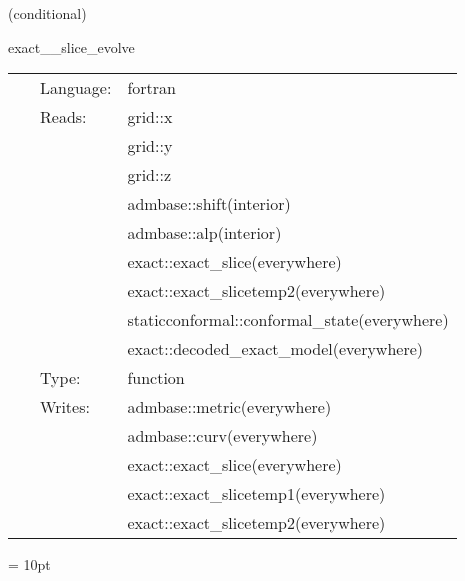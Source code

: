 \vspace{5mm}

   (conditional) 

\hspace{5mm} exact\_\_slice\_evolve 

\hspace{5mm}{\it evolve arbitrary slice and extract cauchy data } 


\hspace{5mm}

 \begin{tabular*}{160mm}{cll} 
~ & Language:  & fortran \\ 
~ & Reads:  & grid::x \\ 
~& ~ &grid::y\\ 
~& ~ &grid::z\\ 
~& ~ &admbase::shift(interior)\\ 
~& ~ &admbase::alp(interior)\\ 
~& ~ &exact::exact\_slice(everywhere)\\ 
~& ~ &exact::exact\_slicetemp2(everywhere)\\ 
~& ~ &staticconformal::conformal\_state(everywhere)\\ 
~& ~ &exact::decoded\_exact\_model(everywhere)\\ 
~ & Type:  & function \\ 
~ & Writes:  & admbase::metric(everywhere) \\ 
~& ~ &admbase::curv(everywhere)\\ 
~& ~ &exact::exact\_slice(everywhere)\\ 
~& ~ &exact::exact\_slicetemp1(everywhere)\\ 
~& ~ &exact::exact\_slicetemp2(everywhere)\\ 
\end{tabular*} 



\vspace{5mm}\parskip = 10pt 
